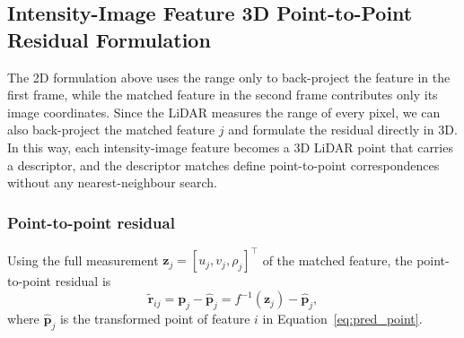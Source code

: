 \subsection{Intensity-Image Feature 3D Point-to-Point Residual Formulation}
\label{sec:feat_res_3d}
The 2D formulation above uses the range only to back-project the feature in the first frame, while the matched feature in the second frame contributes only its image coordinates. Since the LiDAR measures the range of every pixel, we can also back-project the matched feature $j$ and formulate the residual directly in 3D. In this way, each intensity-image feature becomes a 3D LiDAR point that carries a descriptor, and the descriptor matches define point-to-point correspondences without any nearest-neighbour search.

\subsubsection{Point-to-point residual}
Using the full measurement $\mathbf{z}_j = [u_j, v_j, \rho_j]^{\top}$ of the matched feature, the point-to-point residual is
\begin{equation}
    \tilde{\mathbf{r}}_{ij} = \mathbf{p}_j - \hat{\mathbf{p}}_j = f^{-1}\left(\mathbf{z}_j\right) - \hat{\mathbf{p}}_j,
\end{equation}
where $\hat{\mathbf{p}}_j$ is the transformed point of feature $i$ in Equation~\eqref{eq:pred_point}.

